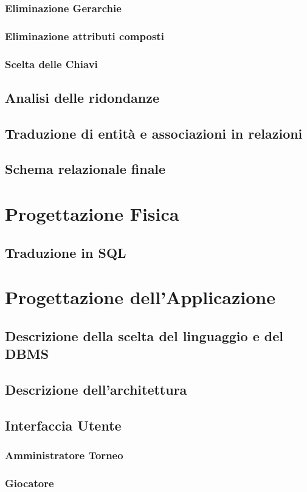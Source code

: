 \documentclass[a4paper,12pt]{report}
\begin{document}
\subsection{Eliminazione Gerarchie}
\subsection{Eliminazione attributi composti}
\subsection{Scelta delle Chiavi}
\section{Analisi delle ridondanze}
\section{Traduzione di entità e associazioni in relazioni}
\section{Schema relazionale finale}


\chapter{Progettazione Fisica}
\section{Traduzione in SQL}


\chapter{Progettazione dell'Applicazione}
\section{Descrizione della scelta del linguaggio e del DBMS}
\section{Descrizione dell'architettura}
\section{Interfaccia Utente}
\subsection{Amministratore Torneo}
\subsection{Giocatore}
\end{document}
